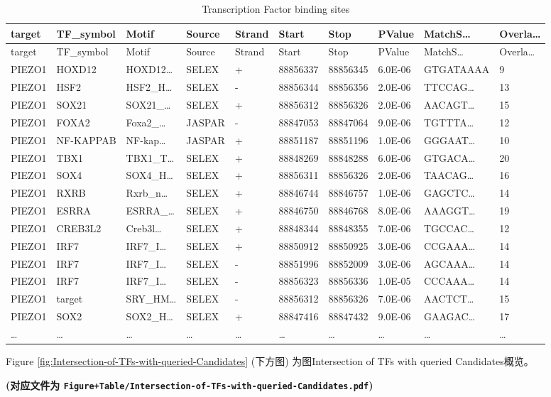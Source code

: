\documentclass[
]{article}
\begin{document}
\begin{longtable}[]{@{}llllllllll@{}}
\caption{\label{tab:Transcription-Factor-binding-sites}Transcription Factor binding sites}\tabularnewline
\toprule
target & TF\_symbol & Motif & Source & Strand & Start & Stop & PValue & MatchS\ldots{} & Overla\ldots{}\tabularnewline
\midrule
\endfirsthead
\toprule
target & TF\_symbol & Motif & Source & Strand & Start & Stop & PValue & MatchS\ldots{} & Overla\ldots{}\tabularnewline
\midrule
\endhead
PIEZO1 & HOXD12 & HOXD12\ldots{} & SELEX & + & 88856337 & 88856345 & 6.0E-06 & GTGATAAAA & 9\tabularnewline
PIEZO1 & HSF2 & HSF2\_H\ldots{} & SELEX & - & 88856344 & 88856356 & 2.0E-06 & TTCCAG\ldots{} & 13\tabularnewline
PIEZO1 & SOX21 & SOX21\_\ldots{} & SELEX & + & 88856312 & 88856326 & 2.0E-06 & AACAGT\ldots{} & 15\tabularnewline
PIEZO1 & FOXA2 & Foxa2\_\ldots{} & JASPAR & - & 88847053 & 88847064 & 9.0E-06 & TGTTTA\ldots{} & 12\tabularnewline
PIEZO1 & NF-KAPPAB & NF-kap\ldots{} & JASPAR & + & 88851187 & 88851196 & 1.0E-06 & GGGAAT\ldots{} & 10\tabularnewline
PIEZO1 & TBX1 & TBX1\_T\ldots{} & SELEX & + & 88848269 & 88848288 & 6.0E-06 & GTGACA\ldots{} & 20\tabularnewline
PIEZO1 & SOX4 & SOX4\_H\ldots{} & SELEX & + & 88856311 & 88856326 & 2.0E-06 & TAACAG\ldots{} & 16\tabularnewline
PIEZO1 & RXRB & Rxrb\_n\ldots{} & SELEX & + & 88846744 & 88846757 & 1.0E-06 & GAGCTC\ldots{} & 14\tabularnewline
PIEZO1 & ESRRA & ESRRA\_\ldots{} & SELEX & + & 88846750 & 88846768 & 8.0E-06 & AAAGGT\ldots{} & 19\tabularnewline
PIEZO1 & CREB3L2 & Creb3l\ldots{} & SELEX & + & 88848344 & 88848355 & 7.0E-06 & TGCCAC\ldots{} & 12\tabularnewline
PIEZO1 & IRF7 & IRF7\_I\ldots{} & SELEX & + & 88850912 & 88850925 & 3.0E-06 & CCGAAA\ldots{} & 14\tabularnewline
PIEZO1 & IRF7 & IRF7\_I\ldots{} & SELEX & - & 88851996 & 88852009 & 3.0E-06 & AGCAAA\ldots{} & 14\tabularnewline
PIEZO1 & IRF7 & IRF7\_I\ldots{} & SELEX & - & 88856323 & 88856336 & 1.0E-05 & CCCAAA\ldots{} & 14\tabularnewline
PIEZO1 & target & SRY\_HM\ldots{} & SELEX & - & 88856312 & 88856326 & 7.0E-06 & AACTCT\ldots{} & 15\tabularnewline
PIEZO1 & SOX2 & SOX2\_H\ldots{} & SELEX & + & 88847416 & 88847432 & 9.0E-06 & GAAGAC\ldots{} & 17\tabularnewline
\ldots{} & \ldots{} & \ldots{} & \ldots{} & \ldots{} & \ldots{} & \ldots{} & \ldots{} & \ldots{} & \ldots{}\tabularnewline
\bottomrule
\end{longtable}

Figure \ref{fig:Intersection-of-TFs-with-queried-Candidates} (下方图) 为图Intersection of TFs with queried Candidates概览。

\textbf{(对应文件为 \texttt{Figure+Table/Intersection-of-TFs-with-queried-Candidates.pdf})}
\end{document}
